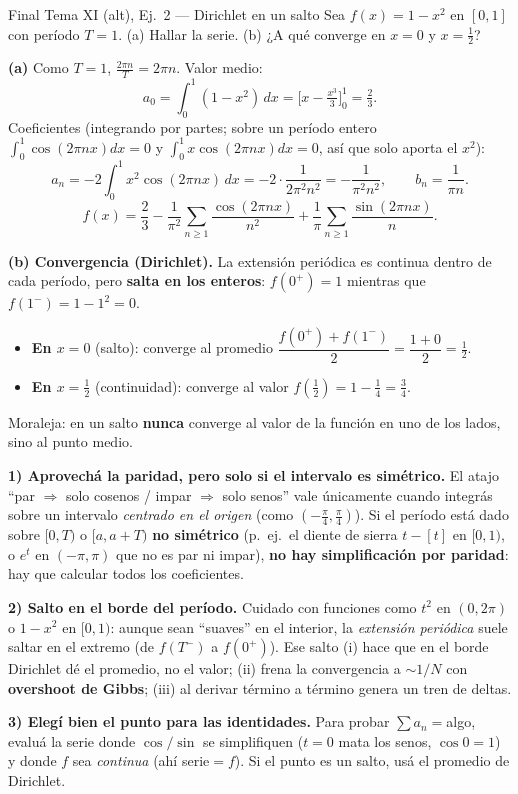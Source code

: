 \begin{ejemplo}{Final Tema XI (alt), Ej.\ 2 — Dirichlet en un salto}
Sea $f(x)=1-x^2$ en $[0,1]$ con período $T=1$. (a) Hallar la serie. (b) ¿A qué converge en $x=0$ y $x=\tfrac12$?

\medskip
\textbf{(a)} Como $T=1$, $\frac{2\pi n}{T}=2\pi n$. Valor medio:
\[
a_0=\int_0^1(1-x^2)\,dx=\Big[x-\tfrac{x^3}{3}\Big]_0^1=\tfrac23.
\]
Coeficientes (integrando por partes; sobre un período entero $\int_0^1\cos(2\pi n x)dx=0$ y $\int_0^1 x\cos(2\pi n x)dx=0$, así que solo aporta el $x^2$):
\[
a_n=-2\int_0^1 x^2\cos(2\pi n x)\,dx=-2\cdot\frac{1}{2\pi^2 n^2}=-\frac{1}{\pi^2 n^2},\qquad
b_n=\frac{1}{\pi n}.
\]
\[
\boxed{\;f(x)=\frac23-\frac{1}{\pi^2}\sum_{n\ge1}\frac{\cos(2\pi n x)}{n^2}+\frac1\pi\sum_{n\ge1}\frac{\sin(2\pi n x)}{n}.\;}
\]

\textbf{(b) Convergencia (Dirichlet).} La extensión periódica es continua dentro de cada período, pero \textbf{salta en los enteros}: $f(0^{+})=1$ mientras que $f(1^{-})=1-1^2=0$.
\begin{itemize}
\item \textbf{En $x=0$} (salto): converge al promedio $\dfrac{f(0^{+})+f(1^{-})}{2}=\dfrac{1+0}{2}=\boxed{\tfrac12}$.
\item \textbf{En $x=\tfrac12$} (continuidad): converge al valor $f(\tfrac12)=1-\tfrac14=\boxed{\tfrac34}$.
\end{itemize}
Moraleja: en un salto \textbf{nunca} converge al valor de la función en uno de los lados, sino al punto medio.
\end{ejemplo}

\begin{truco}
\textbf{1) Aprovechá la paridad, pero solo si el intervalo es simétrico.} El atajo ``par $\Rightarrow$ solo cosenos / impar $\Rightarrow$ solo senos'' vale únicamente cuando integrás sobre un intervalo \emph{centrado en el origen} (como $(-\tfrac\pi4,\tfrac\pi4)$). Si el período está dado sobre $[0,T)$ o $[a,a+T)$ \textbf{no simétrico} (p.\ ej.\ el diente de sierra $t-[t]$ en $[0,1)$, o $e^t$ en $(-\pi,\pi)$ que no es par ni impar), \textbf{no hay simplificación por paridad}: hay que calcular todos los coeficientes.

\textbf{2) Salto en el borde del período.} Cuidado con funciones como $t^2$ en $(0,2\pi)$ o $1-x^2$ en $[0,1)$: aunque sean ``suaves'' en el interior, la \emph{extensión periódica} suele saltar en el extremo (de $f(T^{-})$ a $f(0^{+})$). Ese salto (i) hace que en el borde Dirichlet dé el promedio, no el valor; (ii) frena la convergencia a $\sim1/N$ con \textbf{overshoot de Gibbs}; (iii) al derivar término a término genera un tren de deltas.

\textbf{3) Elegí bien el punto para las identidades.} Para probar $\sum a_n=$algo, evaluá la serie donde $\cos/\sin$ se simplifiquen ($t=0$ mata los senos, $\cos 0=1$) y donde $f$ sea \emph{continua} (ahí serie${}=f$). Si el punto es un salto, usá el promedio de Dirichlet.
\end{truco}

